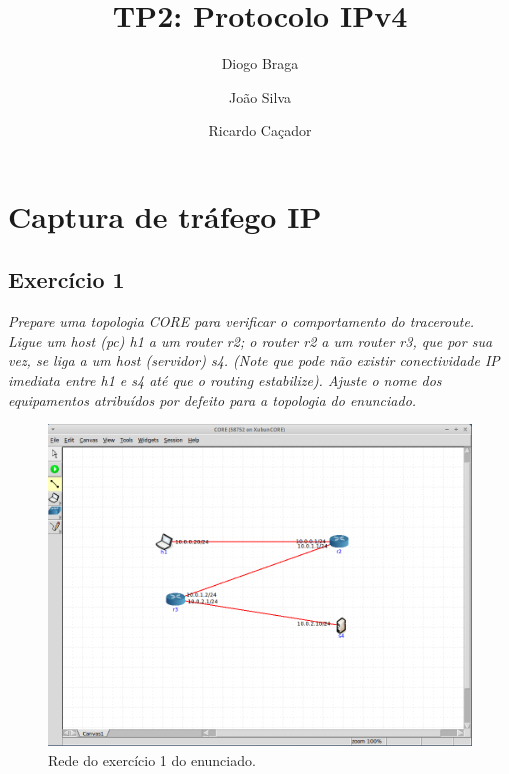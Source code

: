 \documentclass{llncs}
\begin{document}
\mainmatter
\title{TP2: Protocolo IPv4}


\author{Diogo Braga \and João Silva \and Ricardo Caçador}



\date{}


\maketitle

\section{Captura de tráfego IP}

\subsection{Exercício 1}
\emph{Prepare uma 
topologia CORE
para  verificar o comportamento  do traceroute. Ligue um host (pc) h1 a um
router r2; o router r2 a um router r3, que por sua vez, se liga a um host  (servidor) s4. (Note  que  pode  não existir conectividade  IP imediata entre h1 e s4 até que o routing estabilize).
Ajuste  o  nome  dos 
equipamentos atribuídos por defeito para a topologia do enunciado.}

\begin{figure}
\begin{center}
\includegraphics[scale=0.30]{intro.png} 
\end{center}
\caption{\label{fig:intro}Rede do exercício 1 do enunciado.}
\end{figure} 
\end{document}
